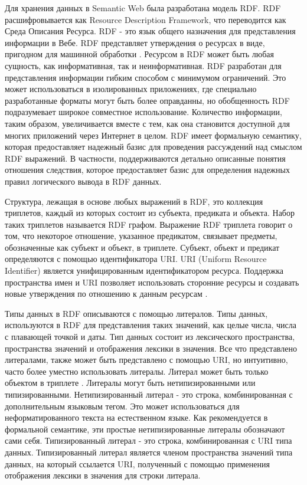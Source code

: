 Для хранения данных в Semantic Web была разработана модель RDF. RDF расшифровывается как Resource Description Framework, что переводится как Среда Описания Ресурса. RDF - это язык общего назначения для представления информации в Вебе. RDF представляет утверждения о ресурсах в виде, пригодном для машинной обработки \cite{aghaei2012evolution}. Ресурсом в RDF может быть любая сущность, как информативная, так и неинформативная. RDF разработан для представления информации гибким способом с минимумом ограничений. Это может использоваться в изолированных приложениях, где специально разработанные форматы могут быть более оправданны, но обобщенность RDF подразумевает широкое совместное использование. Количество информации, таким образом, увеличивается вместе с тем, как она становится доступной для многих приложений через Интернет в целом. RDF имеет формальную семантику, которая предоставляет надежный базис для проведения рассуждений	над смыслом RDF выражений. В частности, поддерживаются детально описанные понятия отношения следствия, которое предоставляет базис для определения надежных правил логического вывода в RDF данных.

Структура, лежащая в основе любых выражений в RDF, это коллекция триплетов, каждый из которых состоит из субъекта, предиката и объекта. Набор таких триплетов называется RDF графом. Выражение RDF триплета говорит о том, что некоторое отношение, указанное предикатом, связывает предметы, обозначенные как субъект и объект, в триплете. Субъект, объект и предикат определяются с помощью идентификатора URI. URI (Uniform Resource Identifier) является унифицированным идентификатором ресурса. Поддержка пространства имен и URI позволяет использовать сторонние ресурсы и создавать новые утверждения по отношению к данным ресурсам \cite{klyne2006resource}.

Типы данных в RDF описываются с помощью литералов. Типы данных, используются в RDF для представления таких значений, как целые числа, числа с плавающей точкой и даты. Тип данных состоит из лексического пространства, пространства значений и отображения лексики в значения. Все что представлено литералами, также может быть представлено с помощью URI, но интуитивно, часто более уместно использовать литералы. Литерал может быть только объектом в триплете \cite{lassila2002taking}. Литералы могут быть нетипизированными или типизированными. Нетипизированный литерал - это строка, комбинированная с дополнительным языковым тегом. Это может использоваться для неформатированного текста на естественном языке. Как рекомендуется в формальной семантике, эти простые нетипизированные литералы обозначают сами себя. Типизированный литерал - это строка, комбинированная с URI типа данных. Типизированный литерал является членом пространства значений типа данных, на который ссылается URI, полученный с помощью применения отображения лексики в значения для строки литерала.

